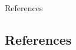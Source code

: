\documentclass{beamer}
\begin{document}
%
%
%
%
%
%
%
%
%
%
%
%
%
%
%
%
%
%
%
%
%







\begin{frame}[shrink=25]{References}
\begin{multicols}{2}
\section*{References}
%
%

\end{multicols}
\end{frame}
\end{document}
